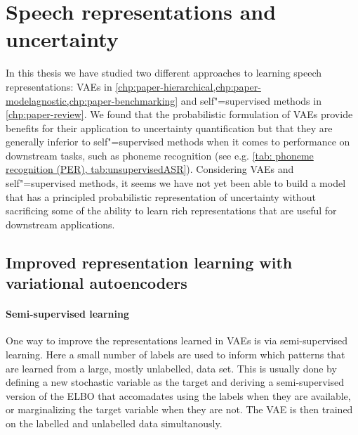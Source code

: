 \section{Speech representations and uncertainty}
%
In this thesis we have studied two different approaches to learning speech representations: VAEs in \cref{chp:paper-hierarchical,chp:paper-modelagnostic,chp:paper-benchmarking} and self"=supervised methods in \cref{chp:paper-review}. 
We found that the probabilistic formulation of VAEs provide benefits for their application to uncertainty quantification but that they are generally inferior to self"=supervised methods when it comes to performance on downstream tasks, such as phoneme recognition (see e.g. \cref{tab: phoneme recognition (PER), tab:unsupervisedASR}). 
Considering VAEs and self"=supervised methods, it seems we have not yet been able to build a model that has a principled probabilistic representation of uncertainty without sacrificing some of the ability to learn rich representations that are useful for downstream applications. 




\subsection{Improved representation learning with variational autoencoders}

\paragraph{Semi-supervised learning} One way to improve the representations learned in VAEs is via semi-supervised learning. 
Here a small number of labels are used to inform which patterns that are learned from a large, mostly unlabelled, data set. 
This is usually done by defining a new stochastic variable as the target and deriving a semi-supervised version of the ELBO that accomadates using the labels when they are available, or marginalizing the target variable when they are not. The VAE is then trained on the labelled and unlabelled data simultanously. 

